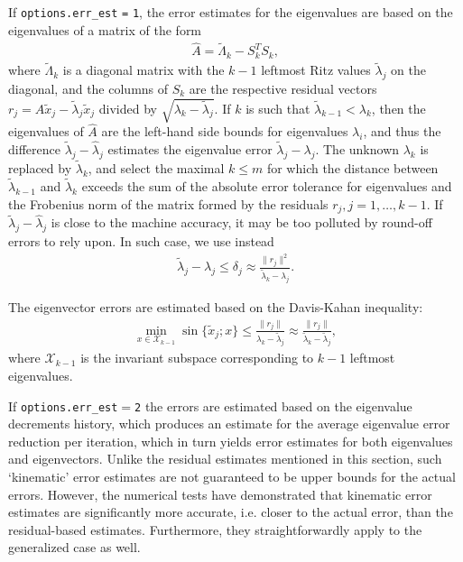 If {\tt options.err\_est} {\tt =} {\tt 1}, 
the error estimates for the eigenvalues are based on 
the eigenvalues of a matrix of the form
%
\begin{eqnarray}
\label{L.mx}
\hat A = %
\tilde\Lambda_k - S_k^T S_k,
\end{eqnarray}
%
where $\tilde\Lambda_k$ is a diagonal matrix with
the $k-1$ leftmost Ritz values $\tilde\lambda_j$
on the diagonal,
and the columns of $S_k$ are the respective
residual vectors $r_j = A \tilde x_j - \tilde\lambda_j \tilde x_j$
divided by $\sqrt{\lambda_k - \tilde\lambda_j}$.
If $k$ is such that
$\tilde\lambda_{k-1} < \lambda_k$,
then the eigenvalues of $\hat A$ are
the left-hand side bounds for
eigenvalues $\lambda_i$,
and thus
the difference $\tilde\lambda_j - \hat\lambda_j$ estimates
the eigenvalue error $\tilde\lambda_j - \lambda_j$.
The unknown  $\lambda_k$ is replaced by $\tilde\lambda_k$,
and select the maximal $k \le m$ for which
the distance between $\tilde\lambda_{k-1}$ and $\tilde\lambda_k$
exceeds the sum of the absolute error tolerance for eigenvalues
and the Frobenius norm of the matrix formed by the residuals
$r_j, j = 1, \ldots, k-1$.
If  $\tilde\lambda_j - \hat\lambda_j$
is close to the machine accuracy, it may be too polluted
by round-off errors to rely upon.
In such case, we use instead
%
\begin{eqnarray}
\tilde\lambda_j - \lambda_j \le \delta_j \approx
\frac{\|r_j\|^2}{\tilde\lambda_k - \lambda_j}.
\end{eqnarray}

The eigenvector errors are estimated based on 
the Davis-Kahan inequality:
%
\begin{eqnarray}
\min_{x \in \mathcal{X}_{k-1}}
\sin\{\tilde x_j; x\} \le
\frac{\|r_j\|}{\lambda_k - \tilde\lambda_j} \approx
\frac{\|r_j\|}{\tilde\lambda_k - \tilde\lambda_j},
\end{eqnarray}
%
where $\mathcal{X}_{k-1}$ is the invariant subspace 
corresponding to $k-1$ leftmost eigenvalues.

If {\tt options.err\_est$=$2}
the errors are estimated
based on the eigenvalue decrements history,
which produces an estimate for the average 
eigenvalue error reduction per iteration,
which in turn yields error estimates
for both eigenvalues and eigenvectors.
Unlike the residual estimates mentioned in this section, 
such `kinematic' error estimates are
not guaranteed to be upper bounds for the actual errors.
However, the numerical tests have demonstrated
that kinematic error estimates 
are significantly more accurate,
i.e. closer to the actual error,
than the residual-based estimates. 
Furthermore, they straightforwardly
apply to the generalized case as well.


